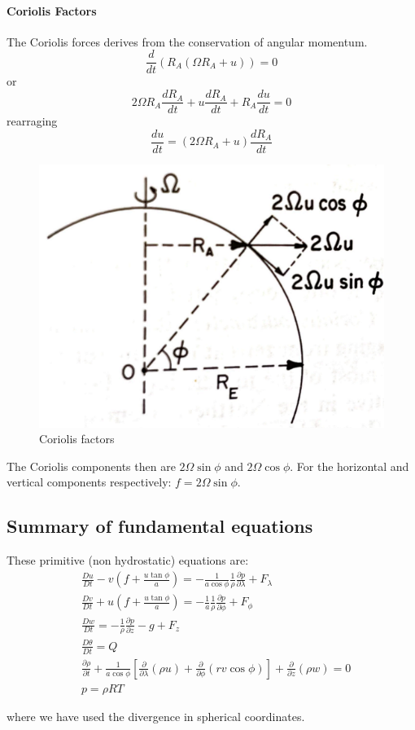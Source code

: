 \paragraph{Coriolis Factors}
The Coriolis forces derives from the conservation of angular momentum.
$$\frac{d}{dt}\left(R_A(\Omega R_A+u)\right)=0$$
or 
$$2\Omega R_A\frac{dR_A}{dt}+u\frac{dR_A}{dt}+R_A\frac{du}{dt}=0$$
rearraging 
$$\frac{du}{dt}=(2\Omega R_A+u)\frac{dR_A}{dt}$$
\begin{figure}[h!]
    \centering
    \includegraphics[width=0.35\linewidth]{uploads/Screenshot 2024-11-21 164025.png}
    \caption{Coriolis factors}
    \label{fig:coriolis}
\end{figure}
The Coriolis components then are $2\Omega\sin\phi$ and $2\Omega\cos\phi$. For the horizontal and vertical components respectively:
$f=2\Omega\sin\phi$. 

\subsection{Summary of fundamental
equations}\label{summary-of-fundamental-equations}
These primitive (non hydrostatic) equations are:
\[\begin{aligned}
&\frac{D u}{Dt} - v\left(f +  \frac{u \tan{\phi}}{a}\right)  = -\frac{1}{ a \cos{\phi}}\frac{1}{\rho}\frac{\partial p}{\partial \lambda}   + F_\lambda \\
&\frac{D v}{Dt} + u\left( f + \frac{u \tan{\phi}}{a}\right)  = -\frac{1}{a}\frac{1}{\rho}\frac{\partial p}{\partial \phi}  + F_\phi \\
&\frac{D w}{Dt}  = -\frac{1}{\rho }\frac{\partial p}{\partial z} -g  + F_z \label{Eq:PrimEq}\\
&\frac{D \theta}{Dt} = Q \\
&\frac{\partial \rho}{\partial t}+\frac{1}{a\cos{\phi}}\left[ \frac{\partial }{\partial \lambda}(\rho u) + \frac{\partial }{\partial \phi}(rv\cos{\phi} )\right] +\frac{\partial }{\partial z}(\rho w) = 0 \\
&p = \rho R T
\end{aligned}\]

where we have used the divergence in spherical coordinates.


